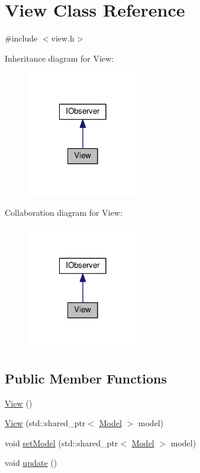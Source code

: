 \hypertarget{class_view}{\section{View Class Reference}
\label{class_view}
}


{\ttfamily \#include $<$view.\-h$>$}



Inheritance diagram for View\-:
\nopagebreak
\begin{figure}[H]
\begin{center}
\leavevmode
\includegraphics[width=138pt]{class_view__inherit__graph}
\end{center}
\end{figure}


Collaboration diagram for View\-:
\nopagebreak
\begin{figure}[H]
\begin{center}
\leavevmode
\includegraphics[width=138pt]{class_view__coll__graph}
\end{center}
\end{figure}
\subsection*{Public Member Functions}
\begin{DoxyCompactItemize}
\item 
\hyperlink{class_view_a44ad60a768422d3fa8fbd7576950080a}{View} ()
\item 
\hyperlink{class_view_a9b238149eafd4bb390ca043437e2b5e8}{View} (std\-::shared\-\_\-ptr$<$ \hyperlink{class_model}{Model} $>$ model)
\item 
void \hyperlink{class_view_aae801a3576c7b6c236ede6d4d6717c06}{set\-Model} (std\-::shared\-\_\-ptr$<$ \hyperlink{class_model}{Model} $>$ model)
\item 
void \hyperlink{class_view_a1c98202846728b495760fad0907b8b0f}{update} ()
\end{DoxyCompactItemize}


